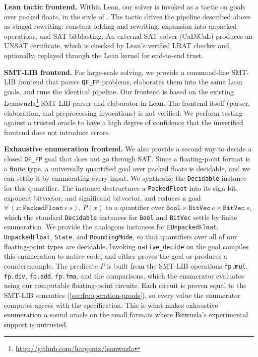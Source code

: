 \noindent\textbf{Lean tactic frontend.}
Within Lean, our solver is invoked as a tactic on goals over packed floats,
in the style of \bvdecide{}.
The tactic drives the pipeline described above as staged rewriting:
constant folding and rewriting, expansion into unpacked operations, and SAT bitblasting.
An external SAT solver (CaDiCaL) produces an UNSAT certificate,
which is checked by Lean's verified LRAT checker and, optionally,
replayed through the Lean kernel for end-to-end trust.

\noindent\textbf{SMT-LIB frontend.}
For large-scale solving, we provide a command-line SMT-LIB frontend that
parses \texttt{QF\_FP} problems, elaborates them into the same Lean goals,
and runs the identical pipeline.
Our frontend is based on the existing Leanwuzla\footnote{\url{http://github.com/hargonix/leanwuzla}} SMT-LIB parser and elaborator in Lean.
The frontend itself (parser, elaboration, and preprocessing invocations) is not verified.
We perform testing against a trusted oracle to have a high degree of confidence that the unverified frontend does not introduce errors.

\noindent\textbf{Exhaustive enumeration frontend.}
We also provide a second way to decide a closed \texttt{QF\_FP} goal that does not go through SAT.
Since a floating-point format is a finite type, a universally quantified goal over packed floats is decidable, and we can settle it by enumerating every input.
We synthesize the \texttt{Decidable} instance for this quantifier.
The instance destructures a \texttt{PackedFloat} into its sign bit, exponent bitvector, and significand bitvector, and reduces a goal $\forall\,(x : \texttt{PackedFloat}~e~s),\, P(x)$ to a quantifier over $\texttt{Bool} \times \texttt{BitVec}~e \times \texttt{BitVec}~s$, which the standard \texttt{Decidable} instances for \texttt{Bool} and \texttt{BitVec} settle by finite enumeration.
We provide the analogous instances for \texttt{EUnpackedFloat}, \texttt{UnpackedFloat}, \texttt{State}, and \texttt{RoundingMode}, so that quantifiers over all of our floating-point types are decidable.
Invoking \texttt{native\_decide} on the goal compiles this enumeration to native code, and either proves the goal or produces a counterexample.
The predicate $P$ is built from the SMT-LIB operations \texttt{fp.mul}, \texttt{fp.div}, \texttt{fp.add}, \texttt{fp.fma}, and the comparisons, which the enumerator evaluates using our computable floating-point circuits.
Each circuit is proven equal to the SMT-LIB semantics (\cref{sec:fp:operation-proofs}), so every value the enumerator computes agrees with the specification.
This is what makes exhaustive enumeration a sound oracle on the small formats where Bitwuzla's experimental support is untrusted.

